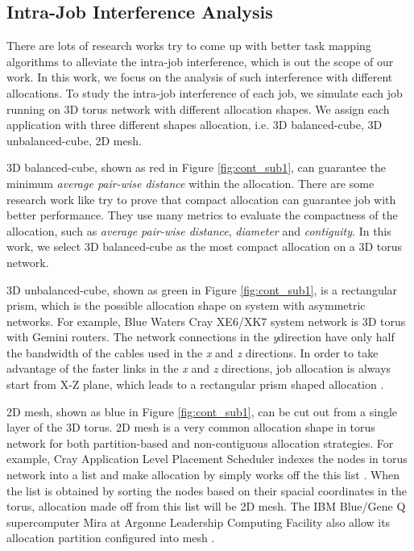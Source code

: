 \documentclass[conference]{IEEEtran}
\begin{document}
\subsection{Intra-Job Interference Analysis}
\label{sec: introjob}

There are lots of research works \cite{jingjin}\cite{ozan} try to come up with better task mapping algorithms to alleviate the intra-job interference, which is out the scope of our work. In this work, we focus on the analysis of such interference with different allocations. To study the intra-job interference of each job, we simulate each job running on 3D torus network with different allocation shapes. We assign each application with three different shapes allocation, i.e. 3D balanced-cube, 3D unbalanced-cube, 2D mesh.

3D balanced-cube, shown as red in Figure \ref{fig:cont_sub1}, can guarantee the minimum \emph{average pair-wise distance} within the allocation. There are some research work like \cite{leung} \cite{abhinav-sc13} try to prove that compact allocation can guarantee job with better performance. They use many metrics to evaluate the compactness of the allocation, such as \emph{average pair-wise distance}, \emph{diameter} and \emph{contiguity}. In this work, we select 3D balanced-cube as the most compact allocation on a 3D torus network. 

3D unbalanced-cube, shown as green in Figure \ref{fig:cont_sub1}, is a rectangular prism, which is the possible allocation shape on system with asymmetric networks. For example, Blue Waters Cray XE6/XK7 system network is 3D torus with Gemini routers. The network connections in the \emph{y}direction have only half the bandwidth of the cables used in the \emph{x} and \emph{z} directions. In order to take advantage of the faster links in the \emph{x} and \emph{z} directions, job allocation is always start from X-Z plane, which leads to a rectangular prism shaped allocation \cite{RF}.

2D mesh, shown as blue in Figure \ref{fig:cont_sub1}, can be cut out from a single layer of the 3D torus. 2D mesh is a very common allocation shape in torus network for both partition-based and non-contiguous allocation strategies. For example, Cray Application Level Placement Scheduler indexes the nodes in torus network into a list and make allocation by simply works off the this list \cite{carl-cug}. When the list is obtained by sorting the nodes based on their spacial coordinates in the torus, allocation made off from this list will be 2D mesh. The IBM Blue/Gene Q supercomputer Mira at Argonne Leadership Computing Facility also allow its allocation partition configured into mesh \cite{zhou-ipdps}. 
\end{document}

